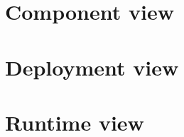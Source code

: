\section{Component view}
\begin{adjustbox}{
        max size={\textwidth}{},
        caption={Component view diagram},
        label={fig:Component view diagram},
        figure=H}
    \centering
\end{adjustbox}
\pagebreak

\section{Deployment view}
\begin{adjustbox}{
        max size={\textwidth}{},
        caption={Deployment view diagram},
        label={fig:Deployment view diagram},
        figure=H}
    \centering
\end{adjustbox}
\pagebreak

\section{Runtime view}

